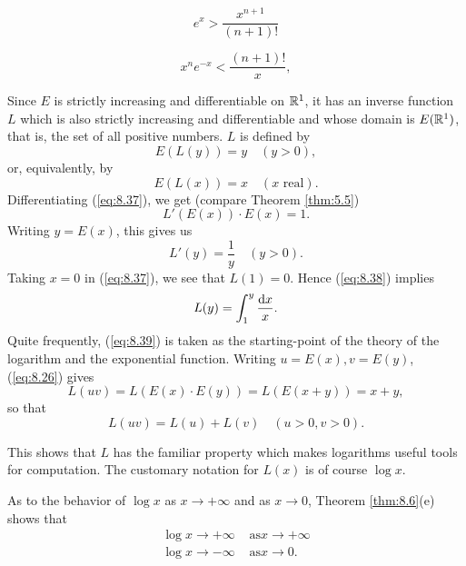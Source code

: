
\begin{equation*}
    e^x>\frac{x^{n+1}}{(n+1)!}
\end{equation*}

\begin{equation*}
    x^n e^{-x} < \frac{(n+1)!}{x},
\end{equation*}


Since $E$ is strictly increasing and differentiable on ${\protect\mathbb R}^1$, 
it has an inverse function $L$ which is also strictly increasing and differentiable and whose domain is $E({\protect\mathbb R}^1)$, 
that is, the set of all positive numbers. $L$ is defined by
\begin{equation}
    \label{eq:8.36}
    E(L(y))=y \quad (y>0),
\end{equation}
or, equivalently, by
\begin{equation}
    \label{eq:8.37}
    E(L(x))=x \quad (x\text{ real}).
\end{equation}
Differentiating (\ref{eq:8.37}), we get (compare Theorem \ref{thm:5.5})
\begin{equation*}
    L'(E(x)) \cdot E(x) = 1.
\end{equation*}
Writing $y = E(x)$, this gives us
\begin{equation}
    \label{eq:8.38}
    L'(y) = \frac{1}{y} \quad (y>0).
\end{equation}
Taking $x = 0$ in (\ref{eq:8.37}), we see that $L(1) = 0$. 
Hence (\ref{eq:8.38}) implies
\begin{equation}
    \label{eq:8.39}
    L(y) = \int_{1}^{y} \frac{\d x}{x}.
\end{equation}
Quite frequently, (\ref{eq:8.39}) is taken as the starting-point of the theory of the logarithm and the exponential function. 
Writing $u = E(x), v = E(y)$, (\ref{eq:8.26}) gives
\begin{equation*}
    L(uv)=L(E(x)\cdot E(y)) = L(E(x+y)) = x+y,
\end{equation*}
so that
\begin{equation}
    \label{eq:8.40}
    L(uv)=L(u)+L(v) \quad (u>0,v>0).
\end{equation}

This shows that $L$ has the familiar property which makes logarithms useful tools for computation. 
The customary notation for $L(x)$ is of course $\log x$.

As to the behavior of $\log x$ as $x \rightarrow + \infty$ and as $x \rightarrow 0$, Theorem \ref{thm:8.6}(e) shows that
\begin{align*}
    \log x \rightarrow + \infty &\text{ as} x \rightarrow + \infty \\
    \log x \rightarrow - \infty &\text{ as} x \rightarrow 0.
\end{align*}

